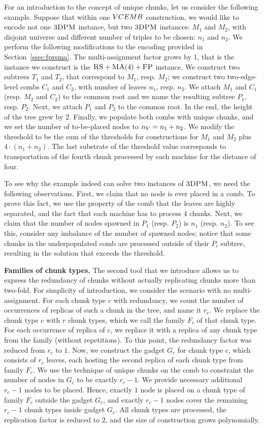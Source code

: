 For an introduction to the concept of unique chunks, let us consider the following example.
Suppose that within one $VCEMB$ construction, we would like to encode not one $\textsc{3DPM}$ instance, but two $\textsc{3DPM}$ instances: $M_1$ and $M_2$, with disjoint universe and different number of triples to be chosen: $n_1$ and $n_2$.
We perform the following modifications to the encoding provided in Section~\ref{ssec:fprsma}.
The multi-assignment factor grows by $1$, that is the instance we construct is the $\textsc{RS}+\textsc{MA}(4)+\textsc{FP}$ instance.
We construct two subtrees $T_1$ and $T_2$, that correspond to $M_1$, resp. $M_2$; we construct two two-edge-level combs $C_1$ and $C_2$, with number of leaves $n_1$, resp. $n_2$.
We attach $M_1$ and $C_1$ (resp. $M_2$ and $C_2$) to the common root and we name the resulting subtree $P_1$, resp. $P_2$.
Next, we attach $P_1$ and $P_2$ to the common root.
In the end, the height of the tree grew by $2$.
Finally, we populate both combs with unique chunks, and we set the number of to-be-placed nodes to $n_V = n_1+n_2$.
We modify the threshold to be the sum of the thresholds for constructions for $M_1$ and $M_2$ plus $4\cdot (n_1 + n_2)$.
The last substrate of the threshold value corresponds to transportation of the fourth chunk processed by each machine for the distance of four.

To see why the example indeed can solve two instances of $\textsc{3DPM}$, we need the following observations.
First, we claim that no node is ever placed in a comb.
To prove this fact, we use the property of the comb that the leaves are highly separated, and the fact that each machine has to process $4$ chunks.
Next, we claim that the number of nodes spawned in $P_1$ (resp. $P_2$) is $n_1$ (resp. $n_2$).
To see this, consider any imbalance of the number of spawned nodes; notice that some chunks in the underpopulated comb are processed outside of their $P_i$ subtree, resulting in the solution that exceeds the threshold.

\textbf{Families of chunk types.} The second tool that we introduce allows us to express the redundancy of chunks without actually replicating chunks more than two-fold.
For simplicity of introduction, we consider the scenario with no multi-assignment.
For each chunk type $c$ with redundancy, we count the number of occurrences of replicas of such a chunk in the tree, and name it $r_c$.
We replace the chunk type $c$ with $r$ chunk types, which we call the family $F_c$ of that chunk type.
For each occurrence of replica of $c$, we replace it with a replica of any chunk type from the family (without repetitions).
To this point, the redundancy factor was reduced from $r_c$ to $1$.
Now, we construct the gadget $G_c$ for chunk type $c$, which consists of $r_c$ leaves, each hosting the second replica of each chunk type from family $F_c$.
We use the technique of unique chunks on the comb to constraint the number of nodes in $G_c$ to be exactly $r_c - 1$.
We provide necessary additional $r_c-1$ nodes to be placed.
Hence, exactly $1$ node is placed on a chunk type of family $F_c$ outside the gadget $G_c$, and exactly $r_c-1$ nodes cover the remaining $r_c-1$ chunk types inside gadget $G_c$.
All chunk types are processed, the replication factor is reduced to $2$, and the size of construction grows polynomially.

